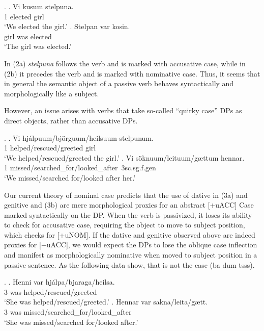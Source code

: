 \documentclass[a4paper, 11pt]{article}
\begin{document}
\begin{enumerate}[label=\textbf{\arabic*.}]
	\ex.
	\ag.
	  Vi kusum stelpuna.\\
	  1 elected girl\\
	  \trans `We elected the girl.'
	\bg.
	  Stelpan var kosin.\\
	  girl was elected\\
	  \trans `The girl was elected.'

	In (2a) \emph{stelpuna} follows the verb and is marked with accusative case, while in (2b) it precedes the verb
	and is marked with nominative case. Thus, it seems that in general the semantic object of a passive verb
	behaves syntactically and morphologically like a subject.

	However, an issue arises with verbs that take so-called ``quirky case'' DPs as direct objects, rather than accusative DPs.

	\ex.
	\ag.
	  Vi hjálpuum/björguum/heilsuum stelpunum.\\
	  1 helped/rescued/greeted girl\\
	  \trans `We helped/rescued/greeted the girl.'
	\bg.
	  Vi söknuum/leituum/g{\ae}ttum hennar.\\
	  1 missed/searched\_for/looked\_after\ 3sc{.sg.f.gen}\\
	  \trans `We missed/searched for/looked after her.'

	Our current theory of nominal case predicts that the use of dative in (3a) and genitive and (3b) are mere morphological
	proxies for an abstract [+uACC] Case marked syntactically on the DP. When the verb is passivized, it loses its
	ability to check for accusative case, requiring the object to move to subject position, which checks for [+uNOM].
	If the dative and genitive observed above are indeed proxies for [+uACC], we would expect the DPs to lose the
	oblique case inflection and manifest as morphologically nominative when moved to subject position in a passive sentence.
	As the following data show, that is not the case (ba dum tsss).

	\ex.
	\ag.
	  Henni var hjálpa/bjaraga/heilsa.\\
	  3 was helped/rescued/greeted\\
	  \trans `She was helped/rescued/greeted.'
	\bg.
	  Hennar var sakna/leita/g{\ae}tt.\\
	  3 was missed/searched\_for/looked\_after\\
	  \trans `She was missed/searched for/looked after.'


\end{enumerate}
\end{document}
